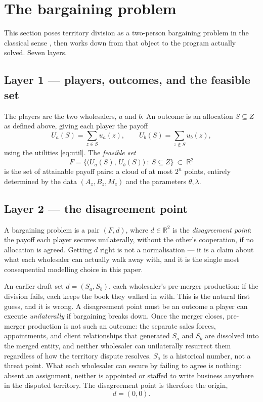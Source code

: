 \documentclass[11pt]{article}
\theoremstyle{remark}\newtheorem*{remark}{Remark}
\newcommand{\Sa}{S_a}\newcommand{\Sb}{S_b}\newcommand{\Amax}{G_a^{\max}}\newcommand{\Bmax}{G_b^{\max}}
\begin{document}
\section{The bargaining problem}\label{sec:statement}

This section poses territory division as a two-person bargaining problem in the classical
sense \citep{nash1950}, then works down from that object to the program actually solved.
Seven layers.

\subsection{Layer 1 --- players, outcomes, and the feasible set}
The players are the two wholesalers, $a$ and $b$. An outcome is an allocation $S\subseteq
Z$ as defined above, giving each player the payoff
\begin{equation}\label{eq:payoffs}
U_a(S)=\sum_{z\in S}u_a(z),\qquad U_b(S)=\sum_{z\notin S}u_b(z),
\end{equation}
using the utilities \eqref{eq:util}. The \emph{feasible set}
\begin{equation}
F=\bigl\{\bigl(U_a(S),\,U_b(S)\bigr)\ :\ S\subseteq Z\bigr\}\ \subset\ \mathbb{R}^2
\end{equation}
is the set of attainable payoff pairs: a cloud of at most $2^n$ points, entirely
determined by the data $(A_z,B_z,M_z)$ and the parameters $\theta,\lambda$.

\subsection{Layer 2 --- the disagreement point}
A bargaining problem is a pair $(F,d)$, where $d\in\mathbb{R}^2$ is the
\emph{disagreement point}: the payoff each player secures unilaterally, without the
other's cooperation, if no allocation is agreed. Getting $d$ right is not a normalisation
--- it is a claim about what each wholesaler can actually walk away with, and it is the
single most consequential modelling choice in this paper.

An earlier draft set $d=(\Sa,\Sb)$, each wholesaler's pre-merger production: if the
division fails, each keeps the book they walked in with. This is the natural first guess,
and it is wrong. A disagreement point must be an outcome a player can execute
\emph{unilaterally} if bargaining breaks down. Once the merger closes, pre-merger
production is not such an outcome: the separate sales forces, appointments, and client
relationships that generated $\Sa$ and $\Sb$ are dissolved into the merged entity, and
neither wholesaler can unilaterally resurrect them regardless of how the territory
dispute resolves. $\Sa$ is a historical number, not a threat point. What each wholesaler
can secure by failing to agree is nothing: absent an assignment, neither is appointed or
staffed to write business anywhere in the disputed territory. The disagreement point is
therefore the origin,
\begin{equation}\label{eq:dpoint}
d=(0,0).
\end{equation}
\end{document}
